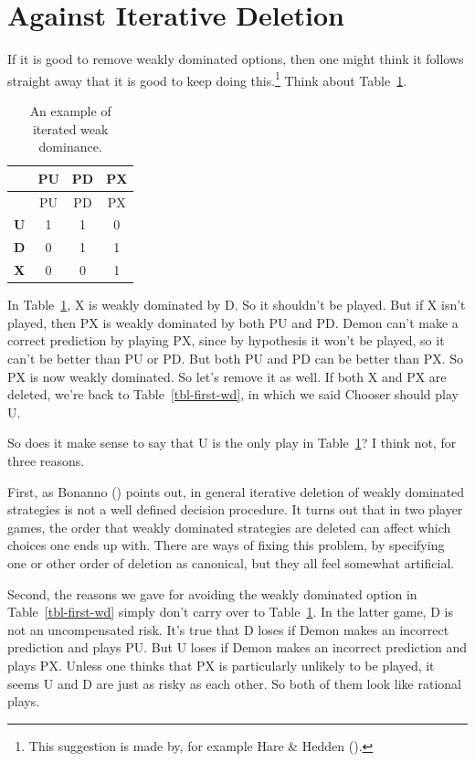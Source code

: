 \documentclass[
  12pt,
  letterpaper,
  DIV=11,
  numbers=noendperiod]{scrreprt}
\begin{document}
\section{Against Iterative Deletion}\label{sec-weak-iterate}

If it is good to remove weakly dominated options, then one might think
it follows straight away that it is good to keep doing this.\footnote{This
  suggestion is made by, for example Hare \& Hedden
  ().} Think about
Table~\ref{tbl-wd-itd}.

\begin{longtable}[]{@{}cccc@{}}
\caption{An example of iterated weak
dominance.}\label{tbl-wd-itd}\tabularnewline
\toprule\noalign{}
& PU & PD & PX \\
\midrule\noalign{}
\endfirsthead
\toprule\noalign{}
& PU & PD & PX \\
\midrule\noalign{}
\endhead
\bottomrule\noalign{}
\endlastfoot
\textbf{U} & 1 & 1 & 0 \\
\textbf{D} & 0 & 1 & 1 \\
\textbf{X} & 0 & 0 & 1 \\
\end{longtable}

In Table~\ref{tbl-wd-itd}, X is weakly dominated by D. So it shouldn't
be played. But if X isn't played, then PX is weakly dominated by both PU
and PD. Demon can't make a correct prediction by playing PX, since by
hypothesis it won't be played, so it can't be better than PU or PD. But
both PU and PD can be better than PX. So PX is now weakly dominated. So
let's remove it as well. If both X and PX are deleted, we're back to
Table~\ref{tbl-first-wd}, in which we said Chooser should play U.

So does it make sense to say that U is the only play in
Table~\ref{tbl-wd-itd}? I think not, for three reasons.

First, as Bonanno () points out, in
general iterative deletion of weakly dominated strategies is not a well
defined decision procedure. It turns out that in two player games, the
order that weakly dominated strategies are deleted can affect which
choices one ends up with. There are ways of fixing this problem, by
specifying one or other order of deletion as canonical, but they all
feel somewhat artificial.

Second, the reasons we gave for avoiding the weakly dominated option in
Table~\ref{tbl-first-wd} simply don't carry over to
Table~\ref{tbl-wd-itd}. In the latter game, D is not an uncompensated
risk. It's true that D loses if Demon makes an incorrect prediction and
plays PU. But U loses if Demon makes an incorrect prediction and plays
PX. Unless one thinks that PX is particularly unlikely to be played, it
seems U and D are just as risky as each other. So both of them look like
rational plays.
\end{document}
